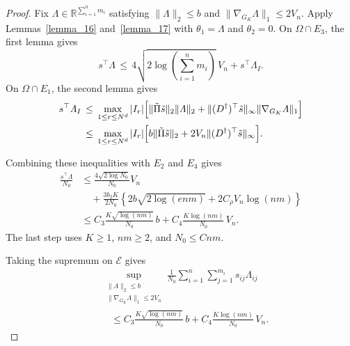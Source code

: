\documentclass[twoside,11pt]{article}
\newenvironment{revision}{\color{revisionred}}{}
\begin{document}
\begin{proof}
\begin{revision}
Fix $\varLambda\in\mathbb R^{\sum_{i=1}^n m_i}$ satisfying
$\|\varLambda\|_2\leq b$ and
$\|\nabla_{G_K}\varLambda\|_1\leq2V_n$.
Apply Lemmas~\ref{lemma_16} and~\ref{lemma_17} with
$\theta_1=\varLambda$ and $\theta_2=0$.
On $\Omega\cap E_3$, the first lemma gives
\[
s^\top\varLambda
\,\leq\,4\sqrt{2\log\left(\sum_{i=1}^n m_i\right)}\,V_n
          +s^\top\varLambda_I .
\]
On $\Omega\cap E_1$, the second lemma gives
\begin{equation}
\label{lemma_10_madrid}
\begin{aligned}
s^\top\varLambda_I
&\,\leq\,\max_{1\leq r\leq N^d}|I_r|
 \Bigl[\|\tilde\Pi\tilde s\|_2\|\varLambda\|_2
       +\|(D^\dag)^\top\tilde s\|_\infty
                             \|\nabla_{G_K}\varLambda\|_1\Bigr]\\
&\,\leq\,\max_{1\leq r\leq N^d}|I_r|
 \Bigl[b\|\tilde\Pi\tilde s\|_2
       +2V_n\|(D^\dag)^\top\tilde s\|_\infty\Bigr].
\end{aligned}
\end{equation}
\end{revision}



\begin{revision}
Combining these inequalities with $E_2$ and $E_4$ gives
\begin{align*}
\frac{s^\top\varLambda}{N_0}
&\leq\frac{4\sqrt{2\log N_0}}{N_0}V_n\\
&\quad+\frac{3b_2K}{2N_0}
   \left\{2b\sqrt{2\log(enm)}+2C_{\rho}V_n\log(nm)\right\}\\
&\leq C_3\frac{K\sqrt{\log(nm)}}{N_0}\,b
      +C_4\frac{K\log(nm)}{N_0}\,V_n.
\end{align*}
The last step uses $K\geq1$, $nm\geq2$, and $N_0\leq Cnm$.
\end{revision}

\begin{revision}
Taking the supremum on $\mathcal E$ gives
\begin{equation}
\label{knn_temp1}
\begin{aligned}
&\sup_{\substack{\|\varLambda\|_2\leq b\\
                \|\nabla_{G_K}\varLambda\|_1\leq2V_n}}
 \frac1{N_0}\sum_{i=1}^n\sum_{j=1}^{m_i}s_{ij}\varLambda_{ij}\\
&\quad\leq C_3\frac{K\sqrt{\log(nm)}}{N_0}\,b
          +C_4\frac{K\log(nm)}{N_0}\,V_n.
\end{aligned}
\end{equation}
\end{revision}


\end{proof}
\end{document}
